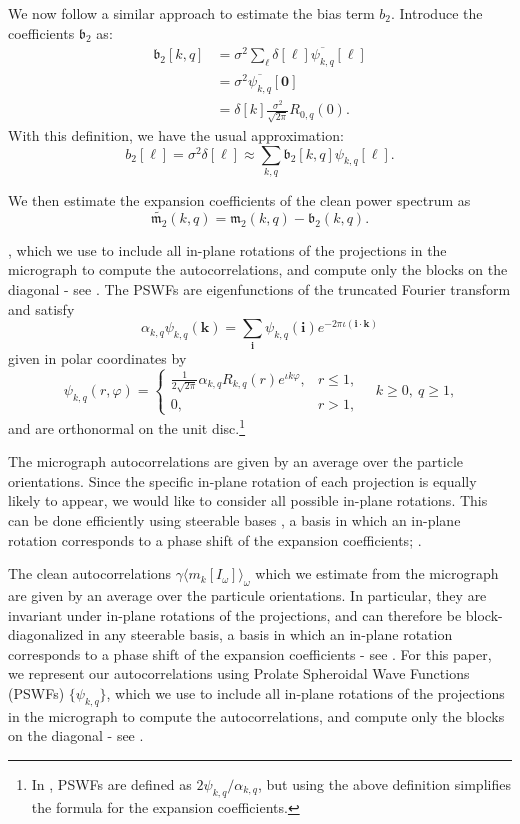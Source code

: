 \documentclass[english,11pt]{article}
\newcommand{\1}{\mathbf{1}}
\newcommand{\mb}{\mathbf}
\newcommand{\mk}{\mathfrak}
\newcommand*\Bell{\ensuremath{\boldsymbol\ell}}
\newcommand{\TODO}[1]{{\color{red}{[#1]}}}
\numberwithin{equation}{section}
\theoremstyle{plain}
\theoremstyle{definition}
\theoremstyle{remark}
\theoremstyle{plain}
\theoremstyle{remark}
\theoremstyle{plain}
\theoremstyle{plain}
\newcommand{\be}{\begin{equation}}
\newcommand{\ee}{\end{equation}}
\begin{document}
We now follow a similar approach to estimate the bias term $b_2$.
Introduce the coefficients $\mathfrak{b}_2$ as: \TODO{We're using that $R$ functions are zero at the origin for $k\neq 0$, right? We didn't introduce that fact so far.}
\[\begin{aligned} 
\mathfrak{b}_2[k,q] & = \sigma^2\sum_{\Bell}\delta[\Bell]\overline{\psi_{k,q}}[\Bell]\\
&= \sigma^2\overline{\psi_{k,q}}[\mb 0]\\
&= \delta[k] \frac{\sigma^2}{\sqrt{2\pi}}R_{0,q}(0). \end{aligned}\]
With this definition, we have the usual approximation:
\[ b_2[\Bell] = \sigma^2\delta[\Bell] \approx \sum_{k,q}\mathfrak{b}_2[k,q]\psi_{k,q}[\Bell].\]


We then estimate the expansion coefficients of the clean power spectrum as
\[ \widetilde{\mk m_2}(k,q) = \mk m_2(k,q) - \mk b_2(k,q).\]

\TODO{---------------------------------------------}


, which we use to include all in-plane rotations of the projections in the micrograph to compute the autocorrelations, and compute only the blocks on the diagonal - see . 
The PSWFs are eigenfunctions of the truncated Fourier transform and satisfy 
\be\label{eq:PSWF_defn_eq}
\alpha_{k,q}\psi_{k,q}(\mb k) = \sum_{\mb i}\psi_{k,q}(\mb i)e^{-2\pi \iota (\mb i\cdot\mb k)}
\ee
given in polar coordinates by
\[ \psi_{k,q}(r,\varphi) = \left\{\begin{array}{ll} \frac{1}{2\sqrt{2\pi}}\alpha_{k,q}R_{k,q}(r)e^{\iota k\varphi}, & r\leq 1,\\ 0, & r>1,\end{array}\right. \quad k\geq 0,\ q\geq 1,\]
and are orthonormal on the unit disc.\footnote{In \cite{landa2017steerable}, PSWFs are defined as $2\psi_{k,q}/\alpha_{k,q}$, but using the above definition simplifies the formula for the expansion coefficients.}


The micrograph autocorrelations are given by an average over the particle orientations.
Since the specific in-plane rotation of each projection is equally likely to appear, we would like to   consider all possible in-plane rotations. 
This can be done efficiently using steerable bases , a basis in which an in-plane rotation corresponds to a phase shift of the expansion coefficients;  \cite{bhamre2016denoising,landa2017steerable,zhao2016fast}.

The clean autocorrelations $\gamma\langle m_k[I_{\omega}]\rangle_{\omega}$ which we estimate from the micrograph are given by an average over the particule orientations. In particular, they are invariant under in-plane rotations of the projections, and can therefore be block-diagonalized in any steerable basis, a basis in which an in-plane rotation corresponds to a phase shift of the expansion coefficients - see \cite{bhamre2016denoising,landa2017steerable,zhao2016fast}. For this paper, we represent our autocorrelations using Prolate Spheroidal Wave Functions (PSWFs) $\{\psi_{k,q}\}$, which we use to include all in-plane rotations of the projections in the micrograph to compute the autocorrelations, and compute only the blocks on the diagonal - see \cite{landa2017steerable}. 
\end{document}

